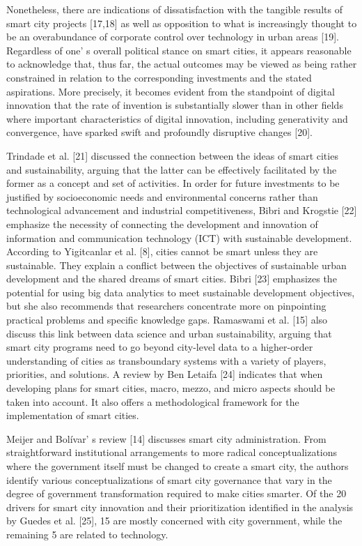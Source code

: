 Nonetheless, there are indications of dissatisfaction with the tangible
results of smart city projects {[}17,18{]} as well as opposition to what
is increasingly thought to be an overabundance of corporate control over
technology in urban areas {[}19{]}. Regardless of one' s
overall political stance on smart cities, it appears reasonable to
acknowledge that, thus far, the actual outcomes may be viewed as being
rather constrained in relation to the corresponding investments and the
stated aspirations. More precisely, it becomes evident from the
standpoint of digital innovation that the rate of invention is
substantially slower than in other fields where important
characteristics of digital innovation, including generativity and
convergence, have sparked swift and profoundly disruptive changes
{[}20{]}.

Trindade et al. {[}21{]} discussed the connection between the ideas of
smart cities and sustainability, arguing that the latter can be
effectively facilitated by the former as a concept and set of
activities. In order for future investments to be justified by
socioeconomic needs and environmental concerns rather than technological
advancement and industrial competitiveness, Bibri and Krogstie {[}22{]}
emphasize the necessity of connecting the development and innovation of
information and communication technology (ICT) with sustainable
development. According to Yigitcanlar et al. {[}8{]}, cities cannot be
smart unless they are sustainable. They explain a conflict between the
objectives of sustainable urban development and the shared dreams of
smart cities. Bibri {[}23{]} emphasizes the potential for using big data
analytics to meet sustainable development objectives, but she also
recommends that researchers concentrate more on pinpointing practical
problems and specific knowledge gaps. Ramaswami et al. {[}15{]} also
discuss this link between data science and urban sustainability, arguing
that smart city programs need to go beyond city-level data to a
higher-order understanding of cities as transboundary systems with a
variety of players, priorities, and solutions. A review by Ben Letaifa
{[}24{]} indicates that when developing plans for smart cities, macro,
mezzo, and micro aspects should be taken into account. It also offers a
methodological framework for the implementation of smart cities.

Meijer and Bolívar' s review {[}14{]} discusses smart
city administration. From straightforward institutional arrangements to
more radical conceptualizations where the government itself must be
changed to create a smart city, the authors identify various
conceptualizations of smart city governance that vary in the degree of
government transformation required to make cities smarter. Of the 20
drivers for smart city innovation and their prioritization identified in
the analysis by Guedes et al. {[}25{]}, 15 are mostly concerned with
city government, while the remaining 5 are related to technology.

